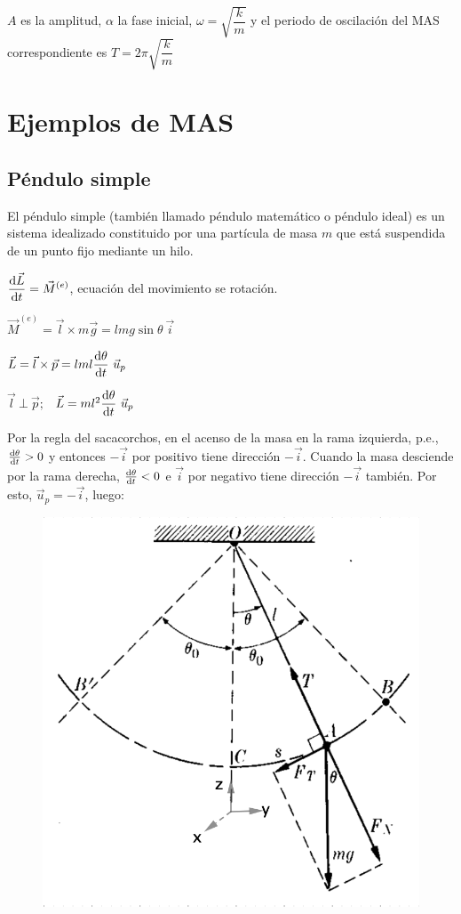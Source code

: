 {$A$ es la amplitud, $\alpha$ la fase inicial, $\omega=\sqrt{\dfrac k m}$ y el periodo de oscilación del MAS correspondiente es $T=2\pi \sqrt{\dfrac k m}$

\vspace{10mm} %
\section{Ejemplos de MAS}

\subsection{Péndulo simple}
El péndulo simple (también llamado péndulo matemático o péndulo ideal) es un sistema idealizado constituido por una partícula de masa $m$ que está suspendida de un punto fijo mediante un hilo.

\begin{multicols}{2}
$\displaystyle \dv{\vec L}{t}=\vec M^{(e)}$, ecuación del movimiento se rotación.	

$\vec M^{(e)}=\vec l \times m\vec g=lmg\sin \theta \ \vec i$

$\vec L= \displaystyle \vec l \times \vec p= l m l \dv{\theta}{t} \ \vec u_p$

$\vec l \ \bot \ \vec p; \ \ $
$\vec L = m l^2 \displaystyle \dv{\theta}{t}\ \vec u_p$

\small{Por la regla del sacacorchos, en el acenso de la masa en la rama izquierda, p.e., $\dv{\theta}{t}>0$ y entonces $-\vec i$ por positivo tiene dirección $-\vec i$. Cuando la masa desciende por la rama derecha, $\dv{\theta}{t}<0$ e $\vec i$ por negativo tiene dirección $-\vec i$ también. Por esto, $\vec u_p=-\vec i$, luego}\normalsize{:}
\begin{figure}[H]
		\centering
		\includegraphics[width=.55\textwidth]{imagenes/imagenes19/T19IM06.png}
	\end{figure}
\end{multicols}

}
